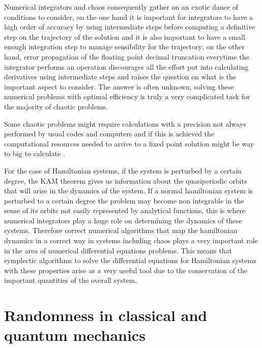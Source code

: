 Numerical integrators and chaos consequently gather on an exotic dance of conditions to consider, on the one hand it is important for integrators to have a high order of accuracy by using intermediate steps before computing a definitive step on the trajectory of the solution and it is also important to have a small enough integration step to manage sensibility for the trajectory; on the other hand, error propagation of the floating point decimal truncation everytime the integrator performs an operation discourages all the effort put into calculating derivatives using intermediate steps and raises the question on what is the important aspect to consider. The answer is often unknown, solving these numerical problems with optimal efficiency is truly a very complicated task for the majority of chaotic problems\cite{lozi2013can}.\par 

Some chaotic problems might require calculations with a precision not always performed by usual codes and computers and if this is achieved the computational resources needed to arrive to a fixed point solution might be way to big to calculate \cite{galias2016numerical}.\par 

For the case of Hamiltonian systems, if the system is perturbed by a certain degree, the KAM theorem gives us information about the quasiperiodic orbits that will arise in the dynamics of the system\cite{arnold2009proof}\cite{kolmogorov1954conservation}\cite{tabor1989chaos}. If a normal hamiltonian system is perturbed to a certain degree the problem may become non integrable in the sense of its orbits not easily represented by analytical functions, this is where numerical integrators play a huge role on determining the dynamics of these systems. Therefore correct numerical algorithms that map the hamiltonian dynamics in a correct way in systems including chaos plays a very important role in the area of numerical differential equations problems. This means that symplectic algorithms to solve the differential equations for Hamiltonian systems with these properties arise as a very useful tool due to the conservation of the important quantities of the overall system.



\section{Randomness in classical and quantum mechanics}

